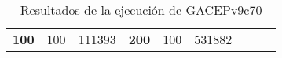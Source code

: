\begin{table}[H]
\begin{tabular}{|ccrccrccc}
\multicolumn{1}{|c|}{\multirow{-39}{*}{\cellcolor[HTML]{FFFFC7}\textbf{100}}} & \multicolumn{1}{c|}{\multirow{-9}{*}{\cellcolor[HTML]{DDFDFF}100}} & \multicolumn{1}{r|}{\cellcolor[HTML]{DAE8FC}111393}    & \multicolumn{1}{c|}{\multirow{-39}{*}{\cellcolor[HTML]{FFFFC7}\textbf{200}}} & \multicolumn{1}{c|}{\multirow{-10}{*}{\cellcolor[HTML]{DDFDFF}100}} & \multicolumn{1}{r|}{\cellcolor[HTML]{DDFDFF}531882}    &                                                                              &                                                                    &                                                        \\ \cline{1-6}
\end{tabular}
\caption{\label{res:GACEPv9c70}Resultados de la ejecución de GACEPv9c70}
\end{table}

